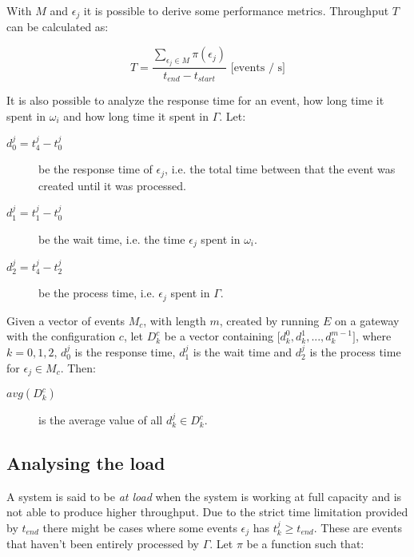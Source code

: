 With $M$ and $\epsilon_j$ it is possible to derive some performance metrics.
Throughput $T$ can be calculated as:

$$
T = \frac{\sum_{\epsilon_j \in M}{\pi(\epsilon_j)}}{t_{end} - t_{start}}
\text{ [events / s]}
$$

It is also possible to analyze the response time for an event, how long time it
spent in $\omega_i$ and how long time it spent in $\Gamma$. Let:

\begin{description}

    \item[$d_0^j = t_4^j - t_0^j$] be the response time of $\epsilon_j$, i.e. the
        total time between that the event was created until it was processed.

    \item[$d_1^j = t_1^j - t_0^j$] be the wait time, i.e. the time $\epsilon_j$
        spent in $\omega_i$.

    \item[$d_2^j = t_4^j - t_2^j$] be the process time, i.e. $\epsilon_j$ spent
        in $\Gamma$.

\end{description}

Given a vector of events $M_c$, with length $m$, created by running $E$ on a
gateway with the configuration $c$, let $D_k^c$ be a vector containing $\big[
    d_k^0, d_k^1, ..., d_k^{m-1} \big]$, where $k = 0, 1, 2$, $d_0^j$ is the
response time, $d_1^j$ is the wait time and $d_2^j$ is the process time for
$\epsilon_j \in M_c$. Then:

\begin{description}

    \item[$avg(D_k^c)$] is the average value of all $d_k^j \in D_k^c$.

\end{description}

\subsection{Analysing the load}
\label{sec:load}

A system is said to be \textit{at load} when the system is working at full
capacity and is not able to produce higher throughput. Due to the
strict time limitation provided by $t_{end}$ there might be cases where some
events $\epsilon_j$ has $t_k^j \geq t_{end}$. These are events that haven't
been entirely processed by $\Gamma$. Let $\pi$ be a function such that:

